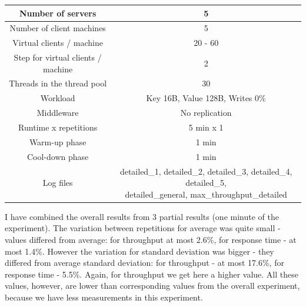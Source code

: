 \documentclass[11pt]{article}
\begin{document}
{\small
\smallskip
\begin{tabular}{|c|c|}
\hline Number of servers & 5 \\ 
\hline Number of client machines & 5 \\ 
\hline Virtual clients / machine &  20 - 60 \\ 
\hline Step for virtual clients / machine & 2 \\
\hline Threads in the thread pool & 30 \\
\hline Workload & Key 16B, Value 128B, Writes 0\% \\
\hline Middleware & No replication \\ 
\hline Runtime x repetitions & 5 min x 1 \\ 
\hline Warm-up phase & 1 min \\
\hline Cool-down phase & 1 min \\
\hline Log files & \parbox[t]{9cm}{detailed\_1, detailed\_2, detailed\_3, detailed\_4, detailed\_5, \\ detailed\_general, max\_throughput\_detailed} \\[3.4ex]
\hline 
\end{tabular} }
\medskip

I have combined the overall results from 3 partial results (one minute of the experiment). The variation between repetitions for average was quite small - values differed from average: for throughput at most 2.6\%, for response time - at most 1.4\%. However the variation for standard deviation was bigger - they differed from average standard deviation: for throughput - at most 17.6\%, for response time - 5.5\%. Again, for throughput we get here a higher value. All these values, however, are lower than corresponding values from the overall experiment, because we have less measurements in this experiment.
\end{document}
